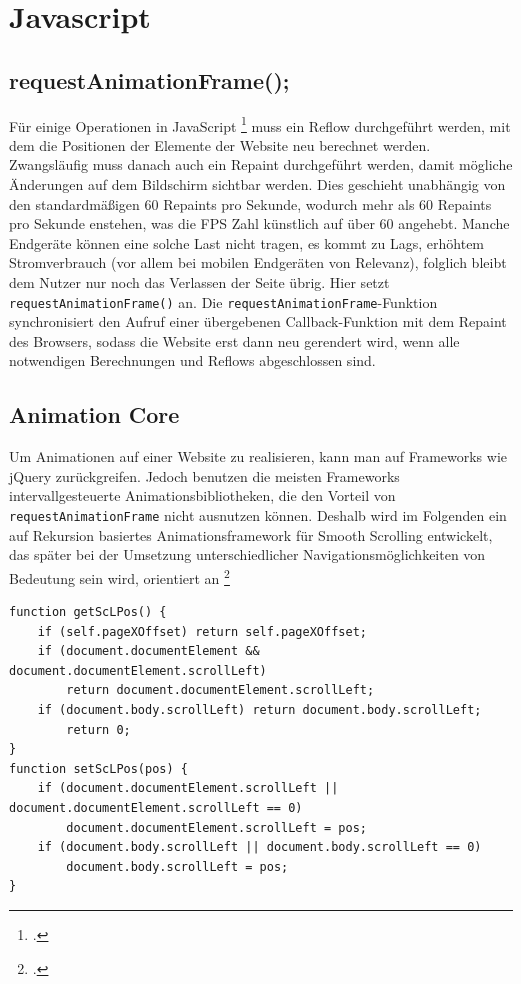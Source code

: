\section{Javascript}

	\subsection{requestAnimationFrame();}

Für einige Operationen in JavaScript \footcite[vgl.][]{reflow} muss ein Reflow durchgeführt werden, mit dem die Positionen der Elemente der Website neu berechnet werden. Zwangsläufig muss danach auch ein Repaint durchgeführt werden, damit mögliche Änderungen auf dem Bildschirm sichtbar werden. Dies geschieht unabhängig von den standardmäßigen 60 Repaints pro Sekunde, wodurch mehr als 60 Repaints pro Sekunde enstehen, was die FPS Zahl künstlich auf über 60 angehebt. Manche Endgeräte können eine solche Last nicht tragen, es kommt zu Lags, erhöhtem Stromverbrauch (vor allem bei mobilen Endgeräten von Relevanz), folglich bleibt dem Nutzer nur noch das Verlassen der Seite übrig. Hier setzt \lstinline{requestAnimationFrame()} an.
Die \lstinline{requestAnimationFrame}-Funktion synchronisiert den Aufruf einer übergebenen Callback-Funktion mit dem Repaint des Browsers, sodass die Website erst dann neu gerendert wird, wenn alle notwendigen Berechnungen und Reflows abgeschlossen sind.


\subsection{Animation Core}
Um Animationen auf einer Website zu realisieren, kann man auf Frameworks wie jQuery zurückgreifen. Jedoch benutzen die meisten Frameworks intervallgesteuerte Animationsbibliotheken, die den Vorteil von \lstinline{requestAnimationFrame} nicht ausnutzen können. Deshalb wird im Folgenden ein auf Rekursion basiertes Animationsframework für Smooth Scrolling entwickelt, das später bei der Umsetzung unterschiedlicher Navigationsmöglichkeiten von Bedeutung sein wird, orientiert an \footcite[vgl.][]{rAF}

\begin{lstlisting}[caption=Die Funktionen setScLPos und getScLPos., label=js_get_set]
function getScLPos() {
	if (self.pageXOffset) return self.pageXOffset;
	if (document.documentElement && document.documentElement.scrollLeft)
		return document.documentElement.scrollLeft; 
	if (document.body.scrollLeft) return document.body.scrollLeft;
		return 0; 
}
function setScLPos(pos) {
	if (document.documentElement.scrollLeft || document.documentElement.scrollLeft == 0)
		document.documentElement.scrollLeft = pos;
	if (document.body.scrollLeft || document.body.scrollLeft == 0)
		document.body.scrollLeft = pos;
}
\end{lstlisting}

